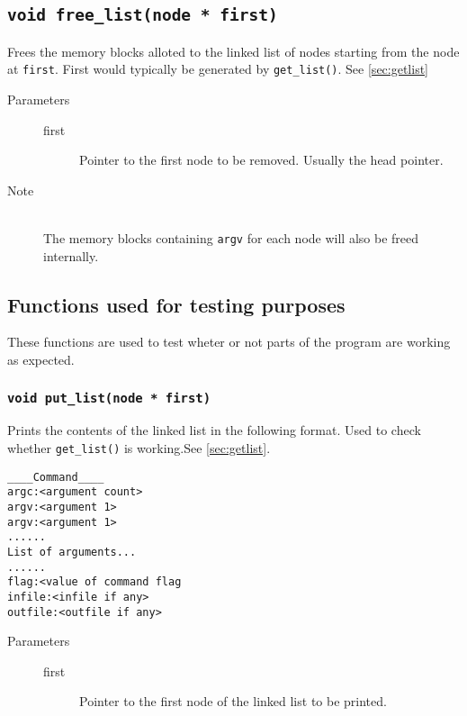 \documentclass{article}
\begin{document}
\subsection{\lstinline{void free_list(node * first)}} \label{sec:freelist}
Frees the memory blocks alloted to the linked list of nodes starting from the node at \lstinline{first}. First would typically be generated by \lstinline{get_list()}. See \ref{sec:getlist}
\begin{description}
	\item[Parameters]\hfill
	\begin{description}
		\item[first] Pointer to the first node to be removed. Usually the head pointer. 
	\end{description}
	\item[Note]\hfill\\
		The memory blocks containing \lstinline{argv} for each node will also be freed internally.
\end{description}

\subsection{Functions used for testing purposes}
These functions are used to test wheter or not parts of the program are working as expected.

\subsubsection{\lstinline{void put_list(node * first)}}
Prints the contents of the linked list in the following format. Used to check whether \lstinline{get_list()} is working.See \ref{sec:getlist}.
\begin{lstlisting}
____Command____
argc:<argument count>
argv:<argument 1>
argv:<argument 1>
......
List of arguments...
......
flag:<value of command flag
infile:<infile if any>
outfile:<outfile if any>
\end{lstlisting}
\begin{description}
	\item[Parameters]\hfill
	\begin{description}
		\item[first] Pointer to the first node of the linked list to be printed.
	\end{description}
\end{description}
\end{document}
